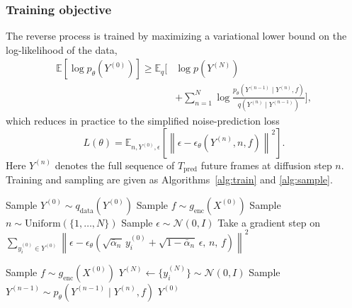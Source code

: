 \documentclass[lettersize,journal]{IEEEtran}
\begin{document}
\subsubsection{\textbf{Training objective}}
The reverse process is trained by maximizing a variational lower bound
on the log-likelihood of the data,
\begin{align}
\mathbb{E}\!\left[\log p_\theta\!\left(Y^{(0)}\right)\right] \geq
\mathbb{E}_q\Bigg[ &\log p\!\left(Y^{(N)}\right) \nonumber\\
&+ \sum_{n=1}^{N} \log
\frac{p_\theta\!\left(Y^{(n-1)} \mid Y^{(n)}, f\right)}
{q\!\left(Y^{(n)} \mid Y^{(n-1)}\right)} \Bigg],
\label{eq:vlb}
\end{align}
which reduces in practice to the simplified noise-prediction loss
\begin{equation}
L(\theta) = \mathbb{E}_{n, Y^{(0)}, \epsilon}
\left[\left\| \epsilon - \epsilon_\theta\!\left(Y^{(n)}, n, f\right)
\right\|^2\right].
\label{eq:simple_loss}
\end{equation}
Here $Y^{(n)}$ denotes the full sequence of $T_{\mathrm{pred}}$ future
frames at diffusion step $n$. Training and sampling are given as
Algorithms~\ref{alg:train} and \ref{alg:sample}.

\begin{algorithm}[t]
\caption{Training the conditional diffusion model}
\label{alg:train}
\begin{algorithmic}[1]
\REPEAT
\STATE Sample $Y^{(0)} \sim q_{\mathrm{data}}\!\left(Y^{(0)}\right)$
\STATE Sample $f \sim g_{\mathrm{enc}}\!\left(X^{(0)}\right)$
\STATE Sample $n \sim \mathrm{Uniform}(\{1,\ldots,N\})$
\STATE Sample $\epsilon \sim \mathcal{N}(0, I)$
\STATE Take a gradient step on
$\sum_{y^{(0)}_i \in Y^{(0)}}
\left\| \epsilon - \epsilon_\theta\!\left(
\sqrt{\bar\alpha_n}\, y^{(0)}_i + \sqrt{1-\bar\alpha_n}\,\epsilon,\,
n,\, f\right)\right\|^2$
\end{algorithmic}
\end{algorithm}

\begin{algorithm}[t]
\caption{Sampling a future waveform}
\label{alg:sample}
\begin{algorithmic}[1]
\STATE Sample $f \sim g_{\mathrm{enc}}\!\left(X^{(0)}\right)$
\STATE $Y^{(N)} \leftarrow \{y^{(N)}_i\} \sim \mathcal{N}(0, I)$
\STATE Sample $Y^{(n-1)} \sim
p_\theta\!\left(Y^{(n-1)} \mid Y^{(n)}, f\right)$
\ENDFOR
\RETURN $Y^{(0)}$
\end{algorithmic}
\end{algorithm}
\end{document}
